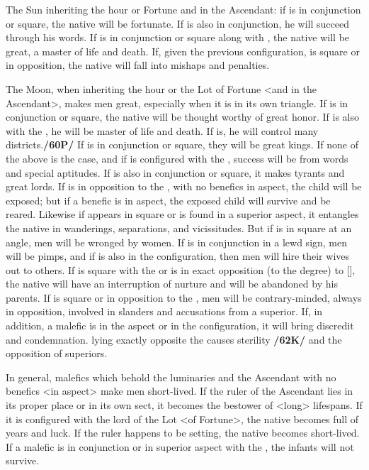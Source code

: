 The Sun inheriting the hour or Fortune and in the Ascendant: if \Jupiter\xspace is in conjunction or square, the native will be fortunate. If \Mercury\xspace is also in conjunction, he will succeed through his words. If \Mars\xspace is in conjunction or square along with \Jupiter, the native will be great, a master of life and death. If, given the previous configuration, \Saturn\xspace is square or in opposition, the native will fall into mishaps and penalties.

The Moon, when inheriting the hour or the Lot of Fortune <and in the Ascendant>, makes men great, especially when it is in its own triangle. If \Venus\xspace is in conjunction or square, the native will be thought worthy of great honor. If \Mars\xspace is also with the \Moon, he will be master of life and death. If \Saturn\xspace is, he will control many districts.\textbf{/60P/} If \Jupiter\xspace is in conjunction or square, they will be great kings. If none of the above is the case, and if \Mercury\xspace is configured with the \Moon, success will be from words and special aptitudes. If \Mars\xspace is also in conjunction or square, it makes tyrants and great lords. If \Mars\xspace is in opposition to the \Moon, with no benefics in aspect, the child will be exposed; but if a benefic is in aspect, the exposed child will survive and be reared. Likewise if \Mars\xspace appears in square or is found in a superior aspect, it entangles the native in wanderings, separations, and vicissitudes. But if \Venus\xspace is in square at an angle, men will be wronged by women. If \Saturn\xspace is in conjunction in a lewd sign, men will be pimps, and if \Mars\xspace is also in the configuration, then men will hire their wives out to others. If \Saturn\xspace is square with the \Moon\xspace or is in \mned exact opposition (to the degree) to [\Saturn], the native will have an interruption of
nurture and will be abandoned by his parents. If \Mercury\xspace is square or in opposition to the \Moon, men will be contrary-minded, always in opposition, involved in slanders and accusations from a superior. If, in addition, a malefic is in the aspect or in the configuration, it will bring discredit and condemnation. \Jupiter\xspace lying \mned exactly opposite the \Moon\xspace causes sterility \textbf{/62K/} and the opposition of superiors.

\mndl[0.2cm]
In general, malefics which behold the luminaries and the Ascendant with no benefics <in aspect> make men short-lived. If the ruler of the Ascendant lies in its proper place or in its own sect, it becomes the bestower of <long> lifespans. If it is configured with the lord of the Lot <of Fortune>, the native becomes full of years and luck. If the ruler happens to be setting, the native becomes short-lived. If a malefic is in conjunction or in superior aspect with the \Moon, the infants will not survive.

\newpage
